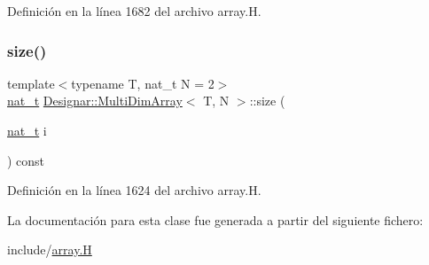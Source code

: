 Definición en la línea 1682 del archivo array.\+H.

\mbox{\label{class_designar_1_1_multi_dim_array_a39d5dcd40ce04bf3113c0f6d83805d0a}} 
\subsubsection{\texorpdfstring{size()}{size()}}
{\footnotesize\ttfamily template$<$typename T, nat\+\_\+t N = 2$>$ \\
\hyperlink{namespace_designar_aa72662848b9f4815e7bf31a7cf3e33d1}{nat\+\_\+t} \hyperlink{class_designar_1_1_multi_dim_array}{Designar\+::\+Multi\+Dim\+Array}$<$ T, N $>$\+::size (\begin{DoxyParamCaption}\item[{\hyperlink{namespace_designar_aa72662848b9f4815e7bf31a7cf3e33d1}{nat\+\_\+t}}]{i }\end{DoxyParamCaption}) const\hspace{0.3cm}{\ttfamily [inline]}}



Definición en la línea 1624 del archivo array.\+H.



La documentación para esta clase fue generada a partir del siguiente fichero\+:\begin{DoxyCompactItemize}
\item 
include/\hyperlink{array_8_h}{array.\+H}\end{DoxyCompactItemize}
